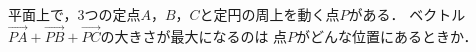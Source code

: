 \documentclass[../../main.tex]{subfiles}
\begin{document}
平面上で，3つの定点$A$，$B$，$C$と定円の周上を動く点$P$がある．
ベクトル$\overrightarrow{PA}+\overrightarrow{PB}+\overrightarrow{PC}$の大きさが最大になるのは
点$P$がどんな位置にあるときか．
\end{document}
